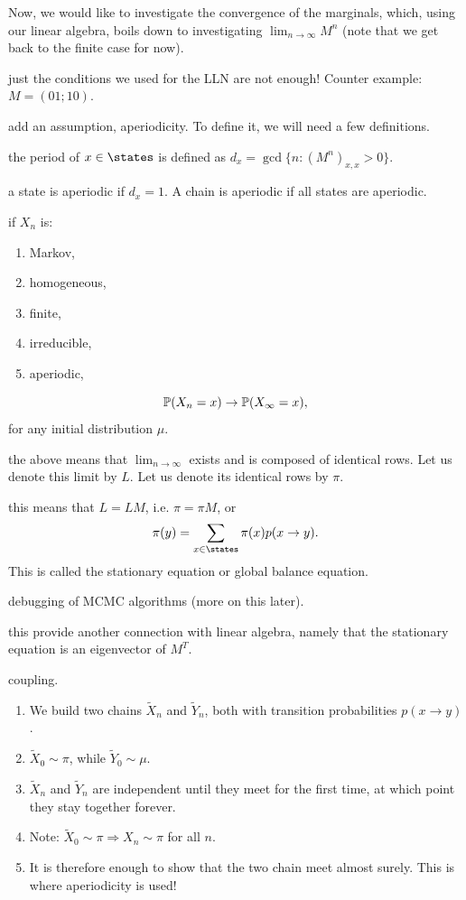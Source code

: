 \documentclass{article}
\begin{document}
Now, we would like to investigate the convergence of the marginals, which, using our linear algebra, boils down to investigating $\lim_{n\to\infty} M^n$ (note that we get back to the finite case for now). 

 just the conditions we used for the LLN are not enough! Counter example: $M = (0 1; 1 0)$.

 add an assumption, aperiodicity. To define it, we will need a few definitions.

 the period of $x\in\states$ is defined as $d_x = \gcd\{n : (M^n)_{x,x} > 0\}$.

 a state is aperiodic if $d_x = 1$. A chain is aperiodic if all states are aperiodic.

 if $X_n$ is:
\begin{enumerate}
  \item Markov,
  \item homogeneous,
  \item finite, 
  \item irreducible,
  \item aperiodic,
\end{enumerate}
\[ \P(X_n = x) \to \P(X_\infty = x), \]for any initial distribution $\mu$.

 the above means that $\lim_{n\to \infty}$ exists and is composed of identical rows. Let us denote this limit by $L$. Let us denote its identical rows by $\pi$. 

 this means that $L = LM$, i.e. $\pi = \pi M$, or \[ \pi(y) = \sum_{x \in \states} \pi(x) p(x \to y). \]This is called the stationary equation or global balance equation.

 debugging of MCMC algorithms (more on this later).

 this provide another connection with linear algebra, namely that the stationary equation is an eigenvector of $M^T$.

 coupling.  
\begin{enumerate}
  \item We build two chains $\tilde X_n$ and $\tilde Y_n$, both with transition probabilities $p(x \to y)$.
  \item $\tilde X_0 \sim \pi$, while $\tilde Y_0 \sim \mu$. 
  \item $\tilde X_n$ and $\tilde Y_n$ are independent until they meet for the first time, at which point they stay together forever.
  \item Note: $\tilde X_0 \sim \pi \Rightarrow X_n \sim \pi$ for all $n$. 
  \item It is therefore enough to show that the two chain meet almost surely. This is where aperiodicity is used!
\end{enumerate}
\end{document}
